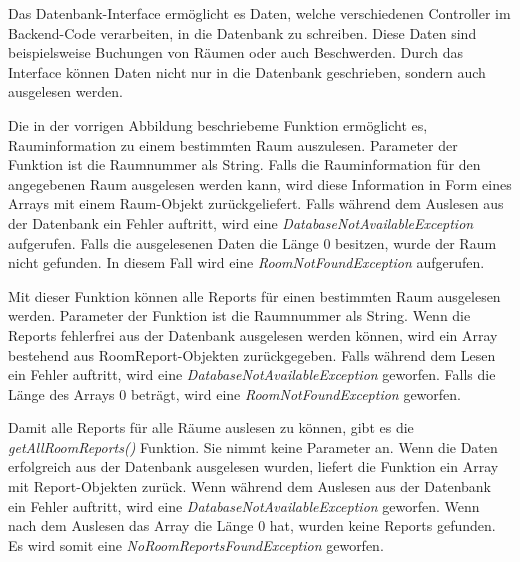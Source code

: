

Das Datenbank-Interface ermöglicht es Daten, welche verschiedenen Controller im Back\-end-Code verarbeiten, in die Datenbank zu schreiben. Diese Daten sind beispielsweise Buchungen von Räumen oder auch Beschwerden. Durch das Interface können Daten nicht nur in die Datenbank geschrieben, sondern auch ausgelesen werden.



Die in der vorrigen Abbildung beschriebeme Funktion ermöglicht es, Rauminformation zu einem bestimmten Raum auszulesen. Parameter der Funktion ist die Raumnummer als String. Falls die Rauminformation für den angegebenen Raum ausgelesen werden kann, wird diese Information in Form eines Arrays mit einem Raum-Objekt zurückgeliefert. Falls während dem Auslesen aus der Datenbank ein Fehler auftritt, wird eine \emph{DatabaseNotAvailableException} aufgerufen. Falls die ausgelesenen Daten die Länge 0 besitzen, wurde der Raum nicht gefunden. In diesem Fall wird eine \emph{RoomNotFoundException} aufgerufen.



Mit dieser Funktion können alle Reports für einen bestimmten Raum ausgelesen werden. Parameter der Funktion ist die Raumnummer als String. Wenn die Reports fehlerfrei aus der Datenbank ausgelesen werden können, wird ein Array bestehend aus RoomReport-Objekten zurückgegeben. Falls während dem Lesen ein Fehler auftritt, wird eine \emph{DatabaseNotAvailableException} geworfen. Falls die Länge des Arrays 0 beträgt, wird eine \emph{RoomNotFoundException} geworfen.


Damit alle Reports für alle Räume auslesen zu können, gibt es die \emph{getAllRoomReports()} Funktion. Sie nimmt keine Parameter an. Wenn die Daten erfolgreich aus der Datenbank ausgelesen wurden, liefert die Funktion ein Array mit Report-Objekten zurück. Wenn während dem Auslesen aus der Datenbank ein Fehler auftritt, wird eine \emph{Database\-Not\-Available\-Exception} geworfen. Wenn nach dem Auslesen das Array die Länge 0 hat, wurden keine Reports gefunden. Es wird somit eine \emph{NoRoomReportsFoundException} geworfen.

